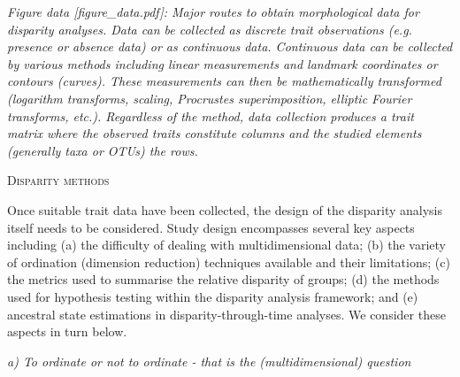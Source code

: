 \documentclass[12pt,letterpaper]{article}
\renewcommand{\section}[1]{%
\bigskip
\begin{center}
\begin{Large}
\normalfont\scshape #1
\medskip
\end{Large}
\end{center}}
\renewcommand{\subsection}[1]{%
\bigskip
\begin{center}
\begin{large}
\normalfont\itshape #1
\end{large}
\end{center}}
\begin{document}
\textit{Figure data {[}figure\_data.pdf{]}: Major routes to obtain morphological data for disparity analyses. Data can be collected as discrete trait observations (e.g. presence or absence data) or as continuous data.
Continuous data can be collected by various methods including linear measurements and landmark coordinates or contours (curves).
These measurements can then be mathematically transformed (logarithm transforms, scaling, Procrustes superimposition, elliptic Fourier transforms, etc.).
Regardless of the method, data collection produces a trait matrix where the observed traits constitute columns and the studied elements (generally taxa or OTUs) the rows.}

\section{Disparity methods}

Once suitable trait data have been collected, the design of the disparity analysis itself needs to be considered.
Study design encompasses several key aspects including (a) the difficulty of dealing with multidimensional data; (b) the variety of ordination (dimension reduction) techniques available and their limitations; (c) the metrics used to summarise the relative disparity of groups; (d) the methods used for hypothesis testing within the disparity analysis framework; and (e) ancestral state estimations in disparity-through-time analyses.
We consider these aspects in turn below.
















\subsection{a) To ordinate or not to ordinate - that is the (multidimensional) question}
\end{document}
